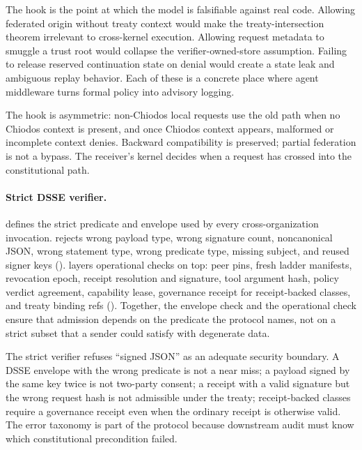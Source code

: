 The hook is the point at which the model is falsifiable against real code. Allowing federated origin without treaty context would make the treaty-intersection theorem irrelevant to cross-kernel execution. Allowing request metadata to smuggle a trust root would collapse the verifier-owned-store assumption. Failing to release reserved continuation state on denial would create a state leak and ambiguous replay behavior. Each of these is a concrete place where agent middleware turns formal policy into advisory logging.

The hook is asymmetric: non-Chiodos local requests use the old path when no Chiodos context is present, and once Chiodos context appears, malformed or incomplete context denies. Backward compatibility is preserved; partial federation is not a bypass. The receiver's kernel decides when a request has crossed into the constitutional path.

\paragraph{Strict DSSE verifier.}
 defines the strict predicate and envelope used by every cross-organization invocation.  rejects wrong payload type, wrong signature count, noncanonical JSON, wrong statement type, wrong predicate type, missing subject, and reused signer keys ().  layers operational checks on top: peer pins, fresh ladder manifests, revocation epoch, receipt resolution and signature, tool argument hash, policy verdict agreement, capability lease, governance receipt for receipt-backed classes, and treaty binding refs (). Together, the envelope check and the operational check ensure that admission depends on the predicate the protocol names, not on a strict subset that a sender could satisfy with degenerate data.

The strict verifier refuses ``signed JSON'' as an adequate security boundary. A DSSE envelope with the wrong predicate is not a near miss; a payload signed by the same key twice is not two-party consent; a receipt with a valid signature but the wrong request hash is not admissible under the treaty; receipt-backed classes require a governance receipt even when the ordinary receipt is otherwise valid. The error taxonomy is part of the protocol because downstream audit must know which constitutional precondition failed.

